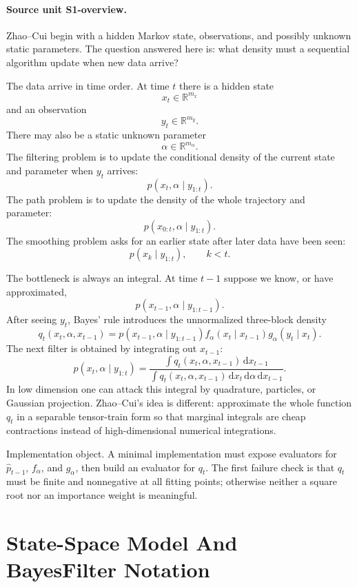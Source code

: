 \documentclass[11pt]{article}
\newcommand{\R}{\mathbb R}
\newcommand{\dd}{\,\mathrm d}
\begin{document}
\paragraph{Source unit S1-overview.}
Zhao--Cui begin with a hidden Markov state, observations, and possibly unknown
static parameters.  The question answered here is: what density must a
sequential algorithm update when new data arrive?

The data arrive in time order.  At time \(t\) there is a hidden state
\[
    x_t\in \R^{m_x}
\]
and an observation
\[
    y_t\in \R^{m_y}.
\]
There may also be a static unknown parameter
\[
    \alpha\in \R^{m_\alpha}.
\]
The filtering problem is to update the conditional density of the current state
and parameter when \(y_t\) arrives:
\[
    p(x_t,\alpha\mid y_{1:t}).
\]
The path problem is to update the density of the whole trajectory and parameter:
\[
    p(x_{0:t},\alpha\mid y_{1:t}).
\]
The smoothing problem asks for an earlier state after later data have been seen:
\[
    p(x_k\mid y_{1:t}),\qquad k<t.
\]

The bottleneck is always an integral.  At time \(t-1\) suppose we know, or have
approximated,
\[
    p(x_{t-1},\alpha\mid y_{1:t-1}).
\]
After seeing \(y_t\), Bayes' rule introduces the unnormalized three-block
density
\[
    q_t(x_t,\alpha,x_{t-1})
    =
    p(x_{t-1},\alpha\mid y_{1:t-1})
    f_\alpha(x_t\mid x_{t-1})
    g_\alpha(y_t\mid x_t).
\]
The next filter is obtained by integrating out \(x_{t-1}\):
\[
    p(x_t,\alpha\mid y_{1:t})
    =
    \frac{\int q_t(x_t,\alpha,x_{t-1})\dd x_{t-1}}
    {\int q_t(x_t,\alpha,x_{t-1})\dd x_t\dd\alpha\dd x_{t-1}}.
\]
In low dimension one can attack this integral by quadrature, particles, or
Gaussian projection.  Zhao--Cui's idea is different: approximate the whole
function \(q_t\) in a separable tensor-train form so that marginal integrals are
cheap contractions instead of high-dimensional numerical integrations.

Implementation object.  A minimal implementation must expose evaluators for
\(\widehat p_{t-1}\), \(f_\alpha\), and \(g_\alpha\), then build an evaluator
for \(q_t\).  The first failure check is that \(q_t\) must be finite and
nonnegative at all fitting points; otherwise neither a square root nor an
importance weight is meaningful.

\section{State-Space Model And BayesFilter Notation}
\end{document}
